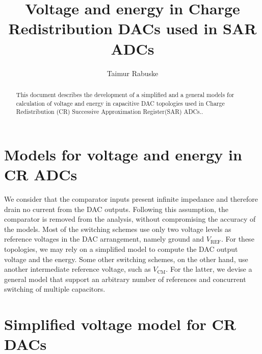 \documentclass[]{article}
\title{Voltage and energy in Charge Redistribution DACs used in SAR ADCs}
\author{Taimur Rabuske}
\newcommand{\vref}{\ensuremath{V_\mathrm{REF}}}
\newcommand{\vcm}{\ensuremath{V_\mathrm{CM}}}
\begin{document}
\maketitle

\begin{abstract}

This document describes the development of a simplified and a general models for calculation of voltage and energy in capacitive DAC topologies used in Charge Redistribution (CR) Successive Approximation Register(SAR) ADCs.. 

\end{abstract}


\section{Models for voltage and energy in CR ADCs}

We consider that the comparator inputs present infinite impedance and therefore drain no current from the DAC outputs. Following this assumption, the comparator is removed from the analysis, without compromising the accuracy of the models. Most of the switching schemes use only two voltage levels as reference voltages in the DAC arrangement, namely ground and $\vref$. For these topologies, we may rely on a simplified model to compute the DAC output voltage and the energy. Some other switching schemes, on the other hand, use another intermediate reference voltage, such as $\vcm$. For the latter, we devise a general model that support an arbitrary number of references and concurrent switching of multiple capacitors.

\section{Simplified voltage model for CR DACs}
\label{subsec:model_simple}

\label{sec:dac_model}
\end{document}
